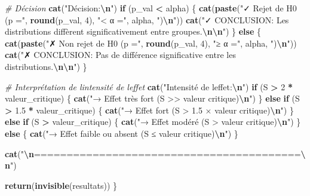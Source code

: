 \documentclass[
  12pt,
]{article}
\newenvironment{Shaded}{\begin{snugshade}}{\end{snugshade}}
\newcommand{\CommentTok}[1]{\textcolor[rgb]{0.56,0.35,0.01}{\textit{#1}}}
\newcommand{\ControlFlowTok}[1]{\textcolor[rgb]{0.13,0.29,0.53}{\textbf{#1}}}
\newcommand{\DecValTok}[1]{\textcolor[rgb]{0.00,0.00,0.81}{#1}}
\newcommand{\FloatTok}[1]{\textcolor[rgb]{0.00,0.00,0.81}{#1}}
\newcommand{\FunctionTok}[1]{\textcolor[rgb]{0.13,0.29,0.53}{\textbf{#1}}}
\newcommand{\NormalTok}[1]{#1}
\newcommand{\SpecialCharTok}[1]{\textcolor[rgb]{0.81,0.36,0.00}{\textbf{#1}}}
\newcommand{\StringTok}[1]{\textcolor[rgb]{0.31,0.60,0.02}{#1}}
\begin{document}
\begin{Shaded}
\begin{Highlighting}[]
  \CommentTok{\# Décision}
  \FunctionTok{cat}\NormalTok{(}\StringTok{"Décision:}\SpecialCharTok{\textbackslash{}n}\StringTok{"}\NormalTok{)}
  \ControlFlowTok{if}\NormalTok{ (p\_val }\SpecialCharTok{\textless{}}\NormalTok{ alpha) \{}
    \FunctionTok{cat}\NormalTok{(}\FunctionTok{paste}\NormalTok{(}\StringTok{"✓ Rejet de H0 (p ="}\NormalTok{, }\FunctionTok{round}\NormalTok{(p\_val, }\DecValTok{4}\NormalTok{), }\StringTok{"\textless{} α ="}\NormalTok{, alpha, }\StringTok{")}\SpecialCharTok{\textbackslash{}n}\StringTok{"}\NormalTok{))}
    \FunctionTok{cat}\NormalTok{(}\StringTok{"✓ CONCLUSION: Les distributions diffèrent significativement entre groupes.}\SpecialCharTok{\textbackslash{}n\textbackslash{}n}\StringTok{"}\NormalTok{)}
\NormalTok{  \} }\ControlFlowTok{else}\NormalTok{ \{}
    \FunctionTok{cat}\NormalTok{(}\FunctionTok{paste}\NormalTok{(}\StringTok{"✗ Non rejet de H0 (p ="}\NormalTok{, }\FunctionTok{round}\NormalTok{(p\_val, }\DecValTok{4}\NormalTok{), }\StringTok{"≥ α ="}\NormalTok{, alpha, }\StringTok{")}\SpecialCharTok{\textbackslash{}n}\StringTok{"}\NormalTok{))}
    \FunctionTok{cat}\NormalTok{(}\StringTok{"✗ CONCLUSION: Pas de différence significative entre les distributions.}\SpecialCharTok{\textbackslash{}n\textbackslash{}n}\StringTok{"}\NormalTok{)}
\NormalTok{  \}}
  
  \CommentTok{\# Interprétation de l\textquotesingle{}intensité de l\textquotesingle{}effet}
  \FunctionTok{cat}\NormalTok{(}\StringTok{"Intensité de l\textquotesingle{}effet:}\SpecialCharTok{\textbackslash{}n}\StringTok{"}\NormalTok{)}
  \ControlFlowTok{if}\NormalTok{ (S }\SpecialCharTok{\textgreater{}} \DecValTok{2} \SpecialCharTok{*}\NormalTok{ valeur\_critique) \{}
    \FunctionTok{cat}\NormalTok{(}\StringTok{"→ Effet très fort (S \textgreater{}\textgreater{} valeur critique)}\SpecialCharTok{\textbackslash{}n}\StringTok{"}\NormalTok{)}
\NormalTok{  \} }\ControlFlowTok{else} \ControlFlowTok{if}\NormalTok{ (S }\SpecialCharTok{\textgreater{}} \FloatTok{1.5} \SpecialCharTok{*}\NormalTok{ valeur\_critique) \{}
    \FunctionTok{cat}\NormalTok{(}\StringTok{"→ Effet fort (S \textgreater{} 1.5 × valeur critique)}\SpecialCharTok{\textbackslash{}n}\StringTok{"}\NormalTok{)}
\NormalTok{  \} }\ControlFlowTok{else} \ControlFlowTok{if}\NormalTok{ (S }\SpecialCharTok{\textgreater{}}\NormalTok{ valeur\_critique) \{}
    \FunctionTok{cat}\NormalTok{(}\StringTok{"→ Effet modéré (S \textgreater{} valeur critique)}\SpecialCharTok{\textbackslash{}n}\StringTok{"}\NormalTok{)}
\NormalTok{  \} }\ControlFlowTok{else}\NormalTok{ \{}
    \FunctionTok{cat}\NormalTok{(}\StringTok{"→ Effet faible ou absent (S ≤ valeur critique)}\SpecialCharTok{\textbackslash{}n}\StringTok{"}\NormalTok{)}
\NormalTok{  \}}
  
  \FunctionTok{cat}\NormalTok{(}\StringTok{"}\SpecialCharTok{\textbackslash{}n}\StringTok{=========================================}\SpecialCharTok{\textbackslash{}n}\StringTok{"}\NormalTok{)}
  
  \FunctionTok{return}\NormalTok{(}\FunctionTok{invisible}\NormalTok{(resultats))}
\NormalTok{\}}
\end{Highlighting}
\end{Shaded}
\end{document}
